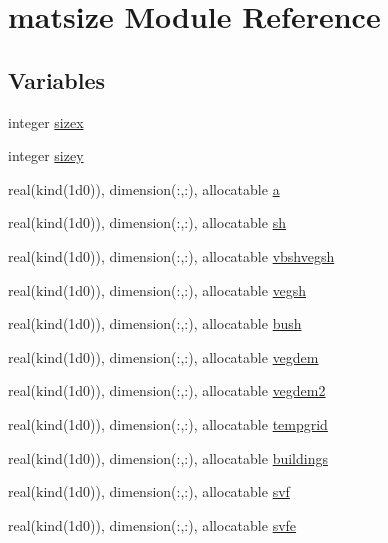 \hypertarget{namespacematsize}{}\section{matsize Module Reference}
\label{namespacematsize}
\subsection*{Variables}
\begin{DoxyCompactItemize}
\item 
integer \hyperlink{namespacematsize_ab94e75e382a77f33021c061c1fd031ba}{sizex}
\item 
integer \hyperlink{namespacematsize_a2e4c4ca15fba50043654eaca59568a8f}{sizey}
\item 
real(kind(1d0)), dimension(\+:,\+:), allocatable \hyperlink{namespacematsize_ac6b0576a44123086ec1fcb4fd07ae0cf}{a}
\item 
real(kind(1d0)), dimension(\+:,\+:), allocatable \hyperlink{namespacematsize_a8646e77bed1b06a41e4d3d230df88854}{sh}
\item 
real(kind(1d0)), dimension(\+:,\+:), allocatable \hyperlink{namespacematsize_a9f51b3ddaf5ee62ef1f8ded44384e64a}{vbshvegsh}
\item 
real(kind(1d0)), dimension(\+:,\+:), allocatable \hyperlink{namespacematsize_ae17419ca9fd6657bfc2f993e9caa074e}{vegsh}
\item 
real(kind(1d0)), dimension(\+:,\+:), allocatable \hyperlink{namespacematsize_a3891f5a70b2d3e3f1ce049f9ab702e87}{bush}
\item 
real(kind(1d0)), dimension(\+:,\+:), allocatable \hyperlink{namespacematsize_a0be49d58735406c79599404544199438}{vegdem}
\item 
real(kind(1d0)), dimension(\+:,\+:), allocatable \hyperlink{namespacematsize_a2265584cbc20b4787247165648ac5fdc}{vegdem2}
\item 
real(kind(1d0)), dimension(\+:,\+:), allocatable \hyperlink{namespacematsize_aabcb952c227c31fd4f5f61afd2fd52cd}{tempgrid}
\item 
real(kind(1d0)), dimension(\+:,\+:), allocatable \hyperlink{namespacematsize_a2787e88d9e90f148065c39be4439c550}{buildings}
\item 
real(kind(1d0)), dimension(\+:,\+:), allocatable \hyperlink{namespacematsize_a94334e57071e6a8dc83f66b04f8ea8fe}{svf}
\item 
real(kind(1d0)), dimension(\+:,\+:), allocatable \hyperlink{namespacematsize_a890ca1fcc0cc7dce50caad1a19886268}{svfe}

\end{DoxyCompactItemize}

